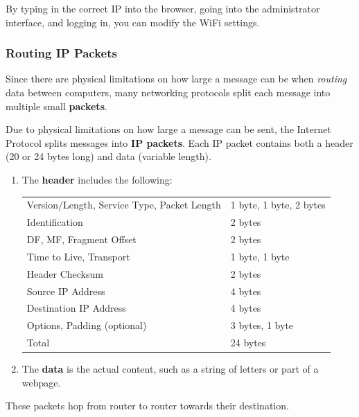 \documentclass{article}
\newcounter{definition}[section]
\begin{document}
  By typing in the correct IP into the browser, going into the administrator interface, and logging in, you can modify the WiFi settings.  

  \subsubsection{Routing IP Packets}
  Since there are physical limitations on how large a message can be when \textit{routing} data between computers, many networking protocols split each message into multiple small \textbf{packets}. 

  \begin{definition}[IP Packets]
    \label{def:ip-packets}
  Due to physical limitations on how large a message can be sent, the Internet Protocol splits messages into \textbf{IP packets}. Each IP packet contains both a header (20 or 24 bytes long) and data (variable length). 
  \begin{enumerate}
      \item The \textbf{header} includes the following: 
      \begin{center}
      \begin{tabular}{l|l}
          Version/Length, Service Type, Packet Length & 1 byte, 1 byte, 2 bytes \\
          Identification & 2 bytes \\
          DF, MF, Fragment Offset & 2 bytes \\
          Time to Live, Transport & 1 byte, 1 byte \\
          Header Checksum & 2 bytes \\
          Source IP Address & 4 bytes\\
          Destination IP Address & 4 bytes \\
          Options, Padding (optional) & 3 bytes, 1 byte \\
          \hline
          Total & 24 bytes
      \end{tabular}
      \end{center}
      \item The \textbf{data} is the actual content, such as a string of letters or part of a webpage. 
  \end{enumerate}
  These packets hop from router to router towards their destination.
  \end{definition}
\end{document}
